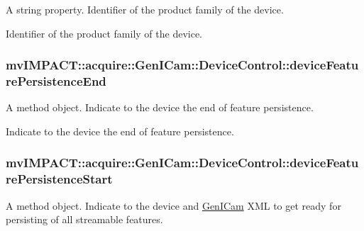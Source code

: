 A string property. Identifier of the product family of the device. 

Identifier of the product family of the device. \hypertarget{classmv_i_m_p_a_c_t_1_1acquire_1_1_gen_i_cam_1_1_device_control_a537e7e4f92ab052ef3b309a2151da1d5}{
\subsubsection[{device\+Feature\+Persistence\+End}]{ mv\+I\+M\+P\+A\+C\+T\+::acquire\+::\+Gen\+I\+Cam\+::\+Device\+Control\+::device\+Feature\+Persistence\+End}}\label{classmv_i_m_p_a_c_t_1_1acquire_1_1_gen_i_cam_1_1_device_control_a537e7e4f92ab052ef3b309a2151da1d5}


A method object. Indicate to the device the end of feature persistence. 

Indicate to the device the end of feature persistence. \hypertarget{classmv_i_m_p_a_c_t_1_1acquire_1_1_gen_i_cam_1_1_device_control_a63d1e4f414c44a8accb0cd5f06708866}{
\subsubsection[{device\+Feature\+Persistence\+Start}]{ mv\+I\+M\+P\+A\+C\+T\+::acquire\+::\+Gen\+I\+Cam\+::\+Device\+Control\+::device\+Feature\+Persistence\+Start}}\label{classmv_i_m_p_a_c_t_1_1acquire_1_1_gen_i_cam_1_1_device_control_a63d1e4f414c44a8accb0cd5f06708866}


A method object. Indicate to the device and \hyperlink{namespacemv_i_m_p_a_c_t_1_1acquire_1_1_gen_i_cam}{Gen\+I\+Cam} X\+M\+L to get ready for persisting of all streamable features. 

